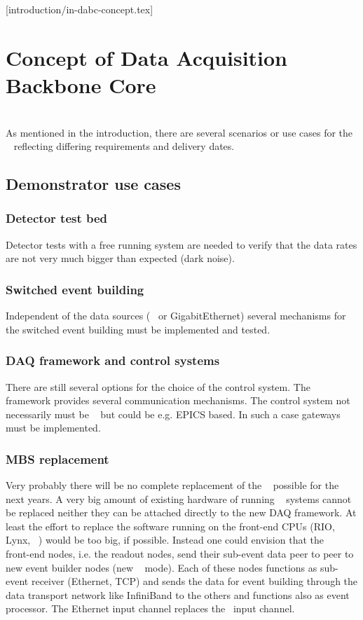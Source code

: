 [introduction/in-dabc-concept.tex]
\section{Concept of Data Acquisition Backbone Core}
\\
As mentioned in the introduction, there are several scenarios or
use cases for the \DDA~ reflecting differing requirements and
delivery dates.
\subsection{Demonstrator use cases}
\subsubsection{Detector test bed}
Detector tests with a free running system are needed to verify
that the data rates are not very much bigger than expected (dark
noise).
\subsubsection{Switched event building}
Independent of the data sources (\ABB~ or GigabitEthernet) several mechanisms for the switched
event building must be implemented and tested.
\subsubsection{DAQ framework and control systems}
There are still several options for the choice of the control system. The \xdaq~ framework
provides several communication mechanisms. The control system not necessarily must be \xdaq~ but
could be e.g. EPICS based. In such a case gateways must be implemented.
\subsubsection{MBS replacement}
 Very probably there will be no complete
replacement of the \mbs~ possible for the next years. A very big
amount of existing hardware of running \mbs~ systems cannot be
replaced neither they can be attached directly to the new DAQ
framework. At least the effort to replace the software running on
the front-end CPUs (RIO, Lynx, \mbs~) would be too big, if
possible. Instead one could envision that the \mbs~ front-end
nodes, i.e. the readout nodes, send their sub-event data peer to
peer to new event builder nodes (new \mbs~ mode). Each of these
nodes functions as sub-event receiver (Ethernet, TCP) and sends
the data for event building through the data transport network
like InfiniBand to the others and functions also as event
processor. The Ethernet input channel replaces the \ABB~input
channel.
